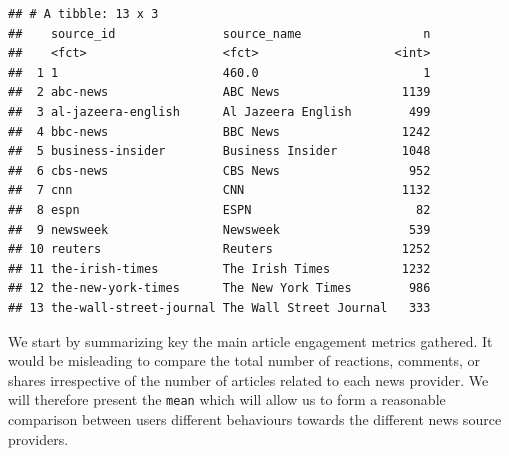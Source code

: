\documentclass[
]{article}
\begin{document}
\begin{verbatim}
## # A tibble: 13 x 3
##    source_id               source_name                 n
##    <fct>                   <fct>                   <int>
##  1 1                       460.0                       1
##  2 abc-news                ABC News                 1139
##  3 al-jazeera-english      Al Jazeera English        499
##  4 bbc-news                BBC News                 1242
##  5 business-insider        Business Insider         1048
##  6 cbs-news                CBS News                  952
##  7 cnn                     CNN                      1132
##  8 espn                    ESPN                       82
##  9 newsweek                Newsweek                  539
## 10 reuters                 Reuters                  1252
## 11 the-irish-times         The Irish Times          1232
## 12 the-new-york-times      The New York Times        986
## 13 the-wall-street-journal The Wall Street Journal   333
\end{verbatim}

We start by summarizing key the main article engagement metrics
gathered. It would be misleading to compare the total number of
reactions, comments, or shares irrespective of the number of articles
related to each news provider. We will therefore present the
\texttt{mean} which will allow us to form a reasonable comparison
between users different behaviours towards the different news source
providers.
\end{document}
